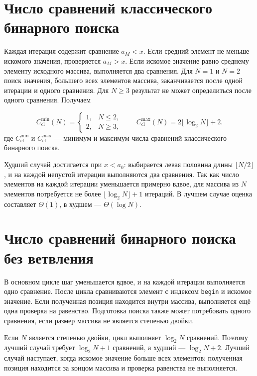 \section{Число сравнений классического бинарного поиска}
Каждая итерация содержит сравнение $a_M<x$. Если средний элемент не меньше искомого значения, проверяется $a_M>x$. Если искомое значение равно среднему элементу исходного массива, выполняется два сравнения. Для $N=1$ и $N=2$ поиск значения, большего всех элементов массива, заканчивается после одной итерации и одного сравнения. Для $N\geq3$ результат не может определиться после одного сравнения. Получаем
\begin{samepage}
\begin{equation}\label{eq:classic}
 C_{\mathrm{cl}}^{\min}(N)=\begin{cases}1,&N\leq2,\\2,&N\geq3,\end{cases}
 \qquad C_{\mathrm{cl}}^{\max}(N)=2\lfloor\log_2N\rfloor+2.
\end{equation}
\indent где $C_{\mathrm{cl}}^{\min}$ и $C_{\mathrm{cl}}^{\max}$ --- минимум и максимум числа сравнений классического бинарного поиска.
\end{samepage}

Худший случай достигается при $x<a_0$: выбирается левая половина длины $\lfloor N/2\rfloor$, и на каждой непустой итерации выполняются два сравнения. Так как число элементов на каждой итерации уменьшается примерно вдвое, для массива из $N$ элементов потребуется не более $\lfloor\log_2N\rfloor+1$ итераций. В лучшем случае оценка составляет $\Theta(1)$, в худшем --- $\Theta(\log N)$.

\section{Число сравнений бинарного поиска без ветвления}
В основном цикле шаг уменьшается вдвое, и на каждой итерации выполняется одно сравнение. После цикла сравниваются элемент с индексом \texttt{begin} и искомое значение. Если полученная позиция находится внутри массива, выполняется ещё одна проверка на равенство. Подготовка поиска также может потребовать одного сравнения, если размер массива не является степенью двойки.

Если $N$ является степенью двойки, цикл выполняет $\log_2N$ сравнений. Поэтому лучший случай требует $\log_2N+1$ сравнений, а худший --- $\log_2N+2$. Лучший случай наступает, когда искомое значение больше всех элементов: полученная позиция находится за концом массива и проверка равенства не выполняется.

